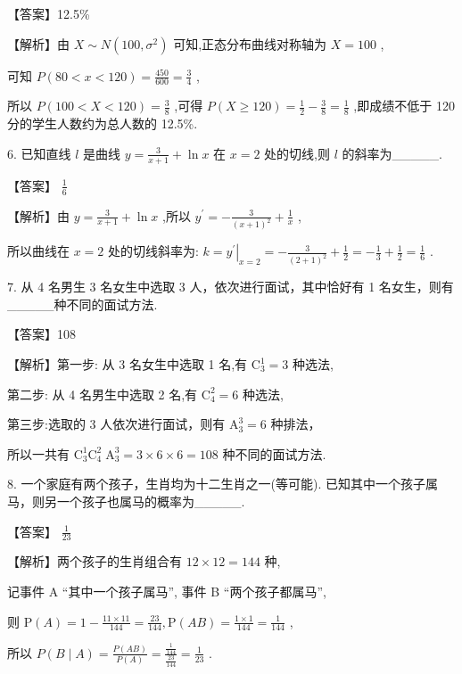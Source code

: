\documentclass[10pt]{article}
\begin{document}
【答案】12.5\%

【解析】由 \(X \sim  N\left( {{100},{\sigma }^{2}}\right)\) 可知,正态分布曲线对称轴为 \(X = {100}\) ,

可知 \(P\left( {{80} < x < {120}}\right)  = \frac{450}{600} = \frac{3}{4}\) ,

所以 \(P\left( {{100} < X < {120}}\right)  = \frac{3}{8}\) ,可得 \(P\left( {X \geq  {120}}\right)  = \frac{1}{2} - \frac{3}{8} = \frac{1}{8}\) ,即成绩不低于 120 分的学生人数约为总人数的 12.5\%.

6. 已知直线 \(l\) 是曲线 \(y = \frac{3}{x + 1} + \ln x\) 在 \(x = 2\) 处的切线,则 \(l\) 的斜率为\_\_\_\_\_.

【答案】 \(\frac{1}{6}\)

【解析】由 \(y = \frac{3}{x + 1} + \ln x\) ,所以 \({y}^{\prime } =  - \frac{3}{{\left( x + 1\right) }^{2}} + \frac{1}{x}\) ,

所以曲线在 \(x = 2\) 处的切线斜率为: \(k = {\left. {y}^{\prime }\right| }_{x = 2} =  - \frac{3}{{\left( 2 + 1\right) }^{2}} + \frac{1}{2} =  - \frac{1}{3} + \frac{1}{2} = \frac{1}{6}\) .

7. 从 4 名男生 3 名女生中选取 3 人，依次进行面试，其中恰好有 1 名女生，则有\_\_\_\_\_种不同的面试方法.

【答案】108

【解析】第一步: 从 3 名女生中选取 1 名,有 \({\mathrm{C}}_{3}^{1} = 3\) 种选法,

第二步: 从 4 名男生中选取 2 名,有 \({\mathrm{C}}_{4}^{2} = 6\) 种选法,

第三步:选取的 3 人依次进行面试，则有 \({\mathrm{A}}_{3}^{3} = 6\) 种排法，

所以一共有 \({\mathrm{C}}_{3}^{1}{\mathrm{C}}_{4}^{2}{\mathrm{\;A}}_{3}^{3} = 3 \times  6 \times  6 = {108}\) 种不同的面试方法.

8. 一个家庭有两个孩子，生肖均为十二生肖之一(等可能). 已知其中一个孩子属马，则另一个孩子也属马的概率为\_\_\_\_\_.

【答案】 \(\frac{1}{23}\)

【解析】两个孩子的生肖组合有 \({12} \times  {12} = {144}\) 种,

记事件 A “其中一个孩子属马”, 事件 B “两个孩子都属马”,

则 \(\mathrm{P}\left( A\right)  = 1 - \frac{{11} \times  {11}}{144} = \frac{23}{144},\mathrm{P}\left( {AB}\right)  = \frac{1 \times  1}{144} = \frac{1}{144}\) ,

所以 \(P\left( {B \mid  A}\right)  = \frac{P\left( {AB}\right) }{P\left( A\right) } = \frac{\frac{1}{144}}{\frac{23}{144}} = \frac{1}{23}\) .
\end{document}

